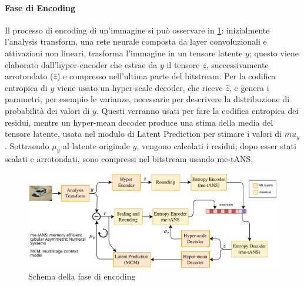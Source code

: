 \paragraph{Fase di Encoding}
Il processo di encoding di un'immagine si può osservare in \ref{fig:encodingJPEGAI}: inizialmente l'analysis transform, una rete neurale composta da layer convoluzionali e  attivazioni non lineari, trasforma l'immagine in un tensore latente $y$; questo viene elaborato dall'hyper-encoder che estrae da $y$ il tensore $z$, successivamente arrotondato ($\hat{z}$) e compresso nell'ultima parte del bitstream.
Per la codifica entropica di $y$  viene usato un hyper-scale decoder, che riceve $\hat{z}$, e genera i parametri, per esempio le varianze, necessarie per descrivere la distribuzione di probabilità dei valori di $y$. Questi verranno usati per fare la codifica entropica dei residui, mentre un hyper-mean decoder produce una stima  della media del tensore latente, usata nel modulo di Latent Prediction per stimare i valori di $mu_y$.
Sottraendo $\mu_y$ al latente originale $y$, vengono calcolati i residui; dopo esser stati scalati e arrotondati, sono compressi nel bitstream usando me-tANS.\\
\begin{figure}
    \centering
    \includegraphics[width=1\linewidth]{img/encongdingJPEGAI.png}
    \caption{Schema della fase di encoding}
    \label{fig:encodingJPEGAI}
\end{figure}
